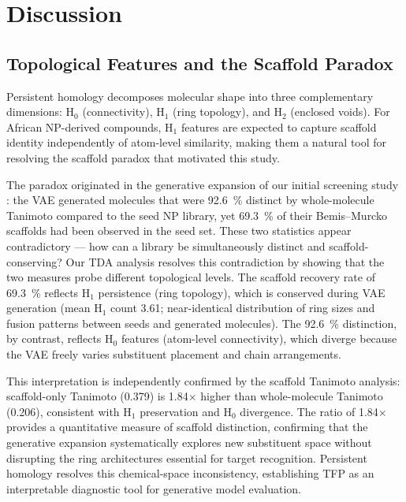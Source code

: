\documentclass[11pt,a4paper]{article}
\begin{document}
\section{Discussion}

\subsection{Topological Features and the Scaffold Paradox}

Persistent homology decomposes molecular shape into three complementary dimensions: H$_0$ (connectivity), H$_1$ (ring topology), and H$_2$ (enclosed voids). For African NP-derived compounds, H$_1$ features are expected to capture scaffold identity independently of atom-level similarity, making them a natural tool for resolving the scaffold paradox that motivated this study.

The paradox originated in the generative expansion of our initial screening study \citep{temgoua2026antimalarial}: the VAE generated molecules that were \qty{92.6}{\percent} distinct by whole-molecule Tanimoto compared to the seed NP library, yet \qty{69.3}{\percent} of their Bemis--Murcko scaffolds had been observed in the seed set. These two statistics appear contradictory --- how can a library be simultaneously distinct and scaffold-conserving? Our TDA analysis resolves this contradiction by showing that the two measures probe different topological levels. The scaffold recovery rate of \qty{69.3}{\percent} reflects H$_1$ persistence (ring topology), which is conserved during VAE generation (mean H$_1$ count 3.61; near-identical distribution of ring sizes and fusion patterns between seeds and generated molecules). The \qty{92.6}{\percent} distinction, by contrast, reflects H$_0$ features (atom-level connectivity), which diverge because the VAE freely varies substituent placement and chain arrangements.

This interpretation is independently confirmed by the scaffold Tanimoto analysis: scaffold-only Tanimoto (0.379) is 1.84$\times$ higher than whole-molecule Tanimoto (0.206), consistent with H$_1$ preservation and H$_0$ divergence. The ratio of 1.84$\times$ provides a quantitative measure of scaffold distinction, confirming that the generative expansion systematically explores new substituent space without disrupting the ring architectures essential for target recognition. Persistent homology resolves this chemical-space inconsistency, establishing TFP as an interpretable diagnostic tool for generative model evaluation.
\end{document}

